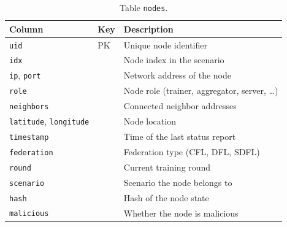 \documentclass[9pt,a4paper,twocolumn]{article}
\begin{document}
\begin{table}[H]
\scriptsize
\begin{tabularx}{\columnwidth}{l l X}
\hline
\textbf{Column} & \textbf{Key} & \textbf{Description} \\
\hline
\texttt{uid}        & PK & Unique node identifier \\
\texttt{idx}        &    & Node index in the scenario \\
\texttt{ip}, \texttt{port} & & Network address of the node \\
\texttt{role}       &    & Node role (trainer, aggregator, server, \ldots) \\
\texttt{neighbors}  &    & Connected neighbor addresses \\
\texttt{latitude}, \texttt{longitude} & & Node location \\
\texttt{timestamp}  &    & Time of the last status report \\
\texttt{federation} &    & Federation type (CFL, DFL, SDFL) \\
\texttt{round}      &    & Current training round \\
\texttt{scenario}   &    & Scenario the node belongs to \\
\texttt{hash}       &    & Hash of the node state \\
\texttt{malicious}  &    & Whether the node is malicious \\
\hline
\end{tabularx}
\caption{Table \texttt{nodes}.}
\label{tab:db-nodes}
\end{table}
\end{document}
